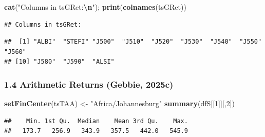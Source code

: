\documentclass[
  12pt,
]{article}
\newenvironment{Shaded}{\begin{snugshade}}{\end{snugshade}}
\newcommand{\DecValTok}[1]{\textcolor[rgb]{0.00,0.00,0.81}{#1}}
\newcommand{\FunctionTok}[1]{\textcolor[rgb]{0.13,0.29,0.53}{\textbf{#1}}}
\newcommand{\NormalTok}[1]{#1}
\newcommand{\OtherTok}[1]{\textcolor[rgb]{0.56,0.35,0.01}{#1}}
\newcommand{\SpecialCharTok}[1]{\textcolor[rgb]{0.81,0.36,0.00}{\textbf{#1}}}
\newcommand{\StringTok}[1]{\textcolor[rgb]{0.31,0.60,0.02}{#1}}
\begin{document}
\begin{Shaded}
\begin{Highlighting}[]
\FunctionTok{cat}\NormalTok{(}\StringTok{"Columns in tsGRet:}\SpecialCharTok{\textbackslash{}n}\StringTok{"}\NormalTok{); }\FunctionTok{print}\NormalTok{(}\FunctionTok{colnames}\NormalTok{(tsGRet))}
\end{Highlighting}
\end{Shaded}

\begin{verbatim}
## Columns in tsGRet:
\end{verbatim}

\begin{verbatim}
##  [1] "ALBI"  "STEFI" "J500"  "J510"  "J520"  "J530"  "J540"  "J550"  "J560" 
## [10] "J580"  "J590"  "ALSI"
\end{verbatim}

\subsubsection{1.4 Arithmetic Returns (Gebbie,
2025c)}\label{arithmetic-returns-tim_btmlx}

\begin{Shaded}
\begin{Highlighting}[]
\FunctionTok{setFinCenter}\NormalTok{(tsTAA) }\OtherTok{\textless{}{-}} \StringTok{"Africa/Johannesburg"}
\FunctionTok{summary}\NormalTok{(dfS[[}\DecValTok{1}\NormalTok{]][,}\DecValTok{2}\NormalTok{])}
\end{Highlighting}
\end{Shaded}

\begin{verbatim}
##    Min. 1st Qu.  Median    Mean 3rd Qu.    Max. 
##   173.7   256.9   343.9   357.5   442.0   545.9
\end{verbatim}
\end{document}
